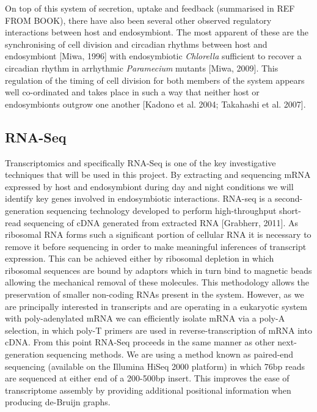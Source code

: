 On top of this system of secretion, uptake and feedback (summarised in REF FROM BOOK), there have also been several other observed regulatory interactions between host and endosymbiont.  
The most apparent of these are the synchronising of cell division and circadian rhythms between host and endosymbiont [Miwa, 1996] with endosymbiotic \textit{Chlorella} sufficient to recover a circadian rhythm in arrhythmic \textit{Paramecium} mutants [Miwa, 2009].  
This regulation of the timing of cell division for both members of the system appears well co-ordinated and takes place in such a way that neither host or endosymbionts outgrow one another [Kadono et al. 2004; Takahashi et al. 2007].


\subsection{RNA-Seq}
Transcriptomics and specifically RNA-Seq is one of the key investigative techniques that will be used in this project.  
By extracting and sequencing mRNA expressed by host and endosymbiont during day and night conditions we will identify key genes involved in endosymbiotic interactions.
RNA-seq is a second-generation sequencing technology developed to perform high-throughput short-read sequencing of cDNA generated from extracted RNA [Grabherr, 2011]. 
As ribosomal RNA forms such a significant portion of cellular RNA it is necessary to remove it before sequencing in order to make meaningful inferences of transcript expression.  
This can be achieved either by ribosomal depletion in which ribosomal sequences are bound by adaptors which in turn bind to magnetic beads allowing the mechanical removal of these molecules.  
This methodology allows the preservation of smaller non-coding RNAs present in the system. However, as we are principally interested in transcripts and are operating in a eukaryotic system with poly-adenylated mRNA we can efficiently isolate mRNA via a poly-A selection, in which poly-T primers are used in reverse-transcription of mRNA into cDNA.
From this point RNA-Seq proceeds in the same manner as other next-generation sequencing methods. 
We are using a method known as paired-end sequencing (available on the Illumina HiSeq 2000 platform) in which 76bp reads are sequenced at either end of a 200-500bp insert. 
This improves the ease of transcriptome assembly by providing additional positional information when producing de-Bruijn graphs. 

